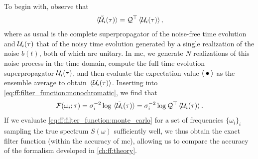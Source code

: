 To begin with, observe that
\begin{align}
    \expval*{\mathcal{\tilde{U}}_i(\tau)} = \mathcal{Q}^\top \expval*{\mathcal{U}_i(\tau)},
\end{align}
where as usual \liouvQ is the complete superpropagator of the noise-free time evolution and $\mathcal{U}_i(\tau)$ that of the noisy time evolution generated by a single realization of the noise $b(t)$, both of which are unitary.
In \gls{mc}, we generate $N$ realizations of this noise process in the time domain, compute the full time evolution superpropagator $\mathcal{U}_i(\tau)$, and then evaluate the expectation value $\expval{\:\bullet\:}$ as the ensemble average to obtain $\ev*{\liouvU_i(\tau)}$.
Inserting into \cref{eq:ff:filter_function:monochromatic}, we find that
\begin{equation}\label{eq:ff:filter_function:monte_carlo}
    \mc{F}(\omega_i; \tau) = \sigma_i^{-2}\log\expval*{\liouvUe_i(\tau)} = \sigma_i^{-2}\log\liouvQ\transpose\expval{\liouvU_i(\tau)}.
\end{equation}
If we evaluate \cref{eq:ff:filter_function:monte_carlo} for a set of frequencies $\lbrace\omega_i\rbrace_i$ sampling the true spectrum $S(\omega)$ sufficiently well, we thus obtain the exact filter function \FFot (within the accuracy of \gls{mc}), allowing us to compare the accuracy of the formalism developed in \cref{ch:ff:theory}.

